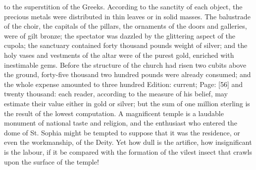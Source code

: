 to the superstition of the Greeks. According to the sanctity of each object, the precious metals were distributed in thin leaves or in solid masses. The balustrade of the choir, the capitals of the pillars, the ornaments of the doors and galleries, were of gilt bronze; the spectator was dazzled by the glittering aspect of the cupola; the sanctuary contained forty thousand pounds weight of silver; and the holy vases and vestments of the altar were of the purest gold, enriched with inestimable gems. Before the structure of the church had risen two cubits above the ground, forty-five thousand two hundred pounds were already consumed; and the whole expense amounted to three hundred Edition: current; Page: [56] and twenty thousand: each reader, according to the measure of his belief, may estimate their value either in gold or silver; but the sum of one million sterling is the result of the lowest computation. A magnificent temple is a laudable monument of national taste and religion, and the enthusiast who entered the dome of St. Sophia might be tempted to suppose that it was the residence, or even the workmanship, of the Deity. Yet how dull is the artifice, how insignificant is the labour, if it be compared with the formation of the vilest insect that crawls upon the surface of the temple!

